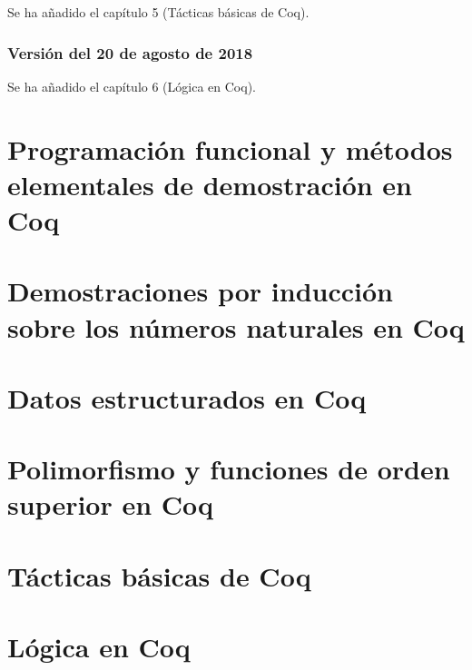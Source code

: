 \documentclass[a4paper,12pt,twoside]{book}
\begin{document}
Se ha añadido el capítulo 5 (Tácticas básicas de Coq).

\subsection*{Versión del 20 de agosto de 2018}

Se ha añadido el capítulo 6 (Lógica en Coq).

\chapter{Programación funcional y métodos elementales de demostración en Coq}

\chapter{Demostraciones por inducción sobre los números naturales en Coq}

\chapter{Datos estructurados en Coq}

\chapter{Polimorfismo y funciones de orden superior en Coq}

\chapter{Tácticas básicas de Coq}

\chapter{Lógica en Coq}

% 
\end{document}

